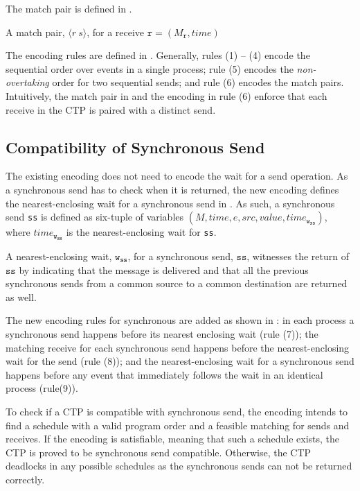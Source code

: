 The match pair is defined in .
\begin{definition}
A match pair, $\langle r\ s\rangle$, for a receive $\mathtt{r}=(M_\mathtt{r},\mathit{time})$
\label{def:mp}
\end{definition}

The encoding rules are defined in \figref{}. Generally, rules (1) -- (4) encode the sequential order over events in a single process; rule (5) encodes the \emph{non-overtaking} order for two sequential sends; and rule (6) encodes the match pairs. Intuitively, the match pair in  and the encoding in rule (6) enforce that each receive in the CTP is paired with a distinct send. 

\setcounter{equation}{0}
\encodingptp

\subsection{Compatibility of Synchronous Send}

The existing encoding does not need to encode the wait for a send operation. As a synchronous send has to check when it is returned, the new encoding defines the nearest-enclosing wait for a synchronous send in . As such, a synchronous send \texttt{ss} is defined as six-tuple of variables $(M,\mathit{time},e,\mathit{src},\mathit{value},\mathit{time}_\mathtt{w_{ss}})$, where $\mathit{time}_\mathtt{w_{ss}}$ is the nearest-enclosing wait for \texttt{ss}.

\begin{definition}
A nearest-enclosing wait, $\mathtt{w}_\mathtt{ss}$, for a synchronous send, $\mathtt{ss}$, witnesses the return of $\mathtt{ss}$ by indicating that the message is delivered and that all the previous synchronous sends from a common source to a common destination are returned as well.
\end{definition}

The new encoding rules for synchronous are added as shown in : in each process a synchronous send happens before its nearest enclosing wait (rule (7)); the matching receive for each synchronous send happens before the nearest-enclosing wait for the send (rule (8)); and the nearest-enclosing wait for a synchronous send happens before any event that immediately follows the wait in an identical process (rule(9)).

\encodingsync

To check if a CTP is compatible with synchronous send, the encoding intends to find a schedule with a valid program order and a feasible matching for sends and receives. If the encoding is satisfiable, meaning that such a schedule exists, the CTP is proved to be synchronous send compatible. Otherwise, the CTP deadlocks in any possible schedules as the synchronous sends can not be returned correctly.


